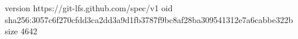 version https://git-lfs.github.com/spec/v1
oid sha256:3057c6f270cfdd3ca2dd3a9d1fb3787f9bc8af28ba309541312e7a6cabbe322b
size 4642
